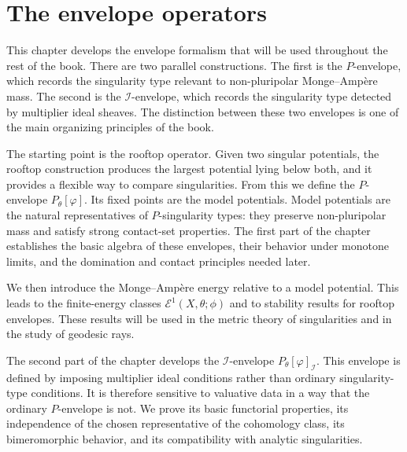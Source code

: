 \chapter{The envelope operators}
\label{chap:envelopes}

This chapter develops the envelope formalism that will be used throughout the rest of the book. There are two parallel constructions. The first is the $P$-envelope, which records the singularity type relevant to non-pluripolar Monge--Amp\`ere mass. The second is the $\mathcal I$-envelope, which records the singularity type detected by multiplier ideal sheaves. The distinction between these two envelopes is one of the main organizing principles of the book.

The starting point is the rooftop operator. Given two singular potentials, the rooftop construction produces the largest potential lying below both, and it provides a flexible way to compare singularities. From this we define the $P$-envelope $P_\theta[\varphi]$. Its fixed points are the model potentials. Model potentials are the natural representatives of $P$-singularity types: they preserve non-pluripolar mass and satisfy strong contact-set properties. The first part of the chapter establishes the basic algebra of these envelopes, their behavior under monotone limits, and the domination and contact principles needed later.

We then introduce the Monge--Amp\`ere energy relative to a model potential. This leads to the finite-energy classes $\mathcal E^1(X,\theta;\phi)$ and to stability results for rooftop envelopes. These results will be used in the metric theory of singularities and in the study of geodesic rays.

The second part of the chapter develops the $\mathcal I$-envelope $P_\theta[\varphi]_{\mathcal I}$. This envelope is defined by imposing multiplier ideal conditions rather than ordinary singularity-type conditions. It is therefore sensitive to valuative data in a way that the ordinary $P$-envelope is not. We prove its basic functorial properties, its independence of the chosen representative of the cohomology class, its bimeromorphic behavior, and its compatibility with analytic singularities.

